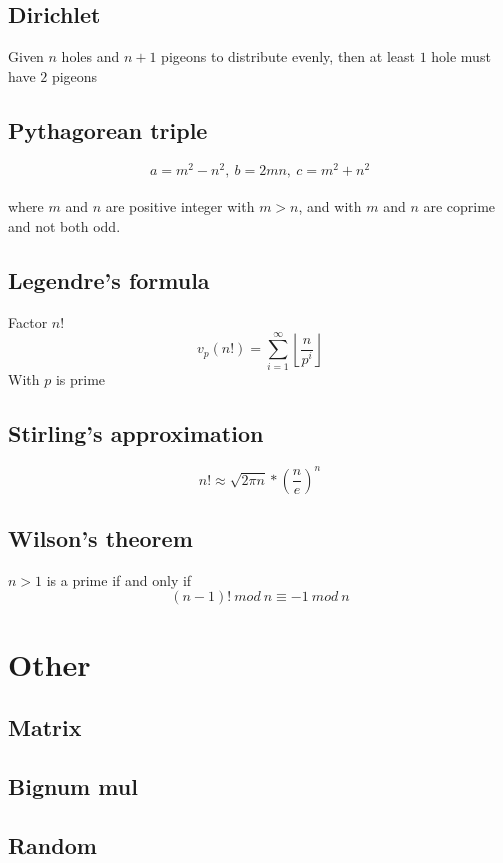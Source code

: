 \documentclass[A4 paper, 12pt, oneside, landscape]{article}
\begin{document}
\begin{multicols}{2}
	\subsection{Dirichlet}
	Given $n$ holes and $n + 1$ pigeons to distribute evenly, then at least $1$ hole must have $2$ pigeons
	
	\subsection{Pythagorean triple}
	\[a = m^2 - n^2, \ b = 2mn, \ c = m^2 + n^2 \] \\
	where $m$ and $n$ are positive integer with $m > n$, and with $m$ and $n$ are coprime and not both odd.
	
	\subsection{Legendre's formula}
	Factor $n!$
	\[v_p(n!) = \sum_{i = 1}^{\infty} \left \lfloor \frac{n}{p ^ i} \right \rfloor \]
	With $p$ is prime
	
	\subsection{Stirling's approximation}
	\[n! \approx \sqrt{2\pi n} * (\frac{n}{e}) ^ n\]
	
	\subsection{Wilson's theorem}
	$n > 1$ is a prime if and only if 
	\[ (n - 1)! \ mod \ n \equiv -1 \ mod \ n \]

\section{Other}
    \subsection{Matrix}
    

	\subsection{Bignum mul}
	
	
	\subsection{Random}
	
	

\end{multicols}
\end{document}
